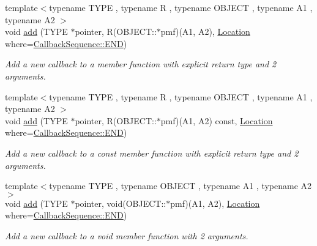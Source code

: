 \begin{DoxyCompactItemize}
{\footnotesize template$<$typename T\+Y\+PE , typename R , typename O\+B\+J\+E\+CT , typename A1 , typename A2 $>$ }\\void \hyperlink{struct_d_d4hep_1_1_callback_sequence_ae918f983607662873095fd1dfe15eccb}{add} (T\+Y\+PE $\ast$pointer, R(O\+B\+J\+E\+C\+T\+::$\ast$pmf)(A1, A2), \hyperlink{struct_d_d4hep_1_1_callback_sequence_a7753490247479633aed16a2376821ef7}{Location} where=\hyperlink{struct_d_d4hep_1_1_callback_sequence_a7753490247479633aed16a2376821ef7ac39eeb1bcfc1c235ab1d0d9315c310ac}{Callback\+Sequence\+::\+E\+ND})
\begin{DoxyCompactList}\small\item\em Add a new callback to a member function with explicit return type and 2 arguments. \end{DoxyCompactList}\item 
{\footnotesize template$<$typename T\+Y\+PE , typename R , typename O\+B\+J\+E\+CT , typename A1 , typename A2 $>$ }\\void \hyperlink{struct_d_d4hep_1_1_callback_sequence_a6a46a8fe88bd371fc3f643afa77d99fc}{add} (T\+Y\+PE $\ast$pointer, R(O\+B\+J\+E\+C\+T\+::$\ast$pmf)(A1, A2) const, \hyperlink{struct_d_d4hep_1_1_callback_sequence_a7753490247479633aed16a2376821ef7}{Location} where=\hyperlink{struct_d_d4hep_1_1_callback_sequence_a7753490247479633aed16a2376821ef7ac39eeb1bcfc1c235ab1d0d9315c310ac}{Callback\+Sequence\+::\+E\+ND})
\begin{DoxyCompactList}\small\item\em Add a new callback to a const member function with explicit return type and 2 arguments. \end{DoxyCompactList}\item 
{\footnotesize template$<$typename T\+Y\+PE , typename O\+B\+J\+E\+CT , typename A1 , typename A2 $>$ }\\void \hyperlink{struct_d_d4hep_1_1_callback_sequence_af301b28e6378f2640e87591e7077409f}{add} (T\+Y\+PE $\ast$pointer, void(O\+B\+J\+E\+C\+T\+::$\ast$pmf)(A1, A2), \hyperlink{struct_d_d4hep_1_1_callback_sequence_a7753490247479633aed16a2376821ef7}{Location} where=\hyperlink{struct_d_d4hep_1_1_callback_sequence_a7753490247479633aed16a2376821ef7ac39eeb1bcfc1c235ab1d0d9315c310ac}{Callback\+Sequence\+::\+E\+ND})
\begin{DoxyCompactList}\small\item\em Add a new callback to a void member function with 2 arguments. \end{DoxyCompactList}\item 

\end{DoxyCompactItemize}
